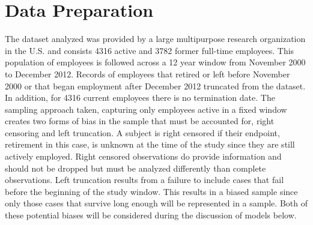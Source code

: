 \documentclass[12pt,letterpaper]{article}
\begin{document}
\section{Data Preparation}\label{data.desc}
The dataset analyzed was provided by a large multipurpose research organization in the U.S. and consists 4316 active and 3782 former full-time employees.  This population of employees is followed across a 12 year window from November 2000 to December 2012.  Records of employees that retired or left before November 2000 or that began employment after December 2012 truncated from the dataset. In addition, for 4316 current employees there is no termination date. The sampling approach taken, capturing only employees active in a fixed window creates two forms of bias in the sample that must be accounted for, right censoring and left truncation. A subject is right censored if their endpoint, retirement in this case, is unknown at the time of the study since they are still actively employed.  Right censored observations do provide information and should not be dropped but must be analyzed differently than complete observations.   Left truncation results from a failure to include cases that fail before the beginning of the study window.  This results in a biased sample since only those cases that survive long enough will be represented in a sample.  Both of these potential biases will be considered during the discussion of models below.
\end{document}
